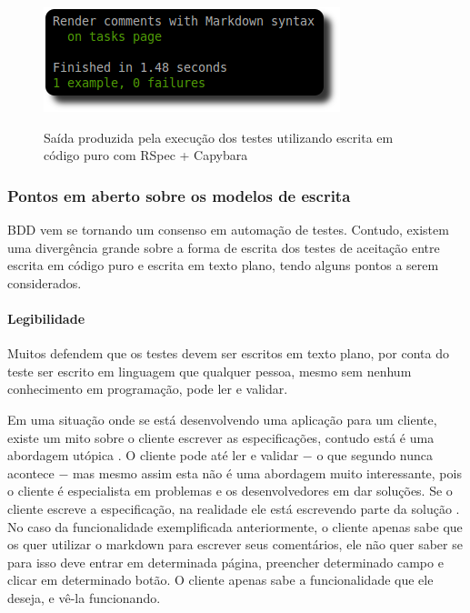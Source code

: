 \begin{figure}[h]
  \center
  \caption{Saída produzida pela execução dos testes utilizando escrita em código puro com RSpec + Capybara}
  \includegraphics[scale=0.6]{images/rspec-acceptance-exec}
  \label{img:rspec-acceptance-exec}
\end{figure}


\subsubsection{Pontos em aberto sobre os modelos de escrita}
\label{ssub:pontos_em_aberto}

BDD vem se tornando um consenso em automação de testes. Contudo, existem uma divergência grande sobre a forma de escrita dos testes de aceitação entre escrita em código puro e escrita em texto plano, tendo alguns pontos a serem considerados.


\paragraph{Legibilidade}
\label{sssub:legibilidade}

Muitos defendem que os testes devem ser escritos em texto plano, por conta do teste ser escrito em linguagem que qualquer pessoa, mesmo sem nenhum conhecimento em programação, pode ler e validar.

Em uma situação onde se está desenvolvendo uma aplicação para um cliente, existe um mito sobre o cliente escrever as especificações, contudo está é uma abordagem utópica \cite{SteakOverCucumber, CucumberForVegetarians, ClientsWritingCucumber}. O cliente pode até ler e validar $-$ o que segundo  nunca acontece $-$ mas mesmo assim esta não é uma abordagem muito interessante, pois o cliente é especialista em problemas e os desenvolvedores em dar soluções. Se o cliente escreve a especificação, na realidade ele está escrevendo parte da solução \cite{SteakOverCucumber}. No caso da funcionalidade exemplificada anteriormente, o cliente apenas sabe que os quer utilizar o markdown para escrever seus comentários, ele não quer saber se para isso deve entrar em determinada página, preencher determinado campo e clicar em determinado botão. O cliente apenas sabe a funcionalidade que ele deseja, e vê-la funcionando.

